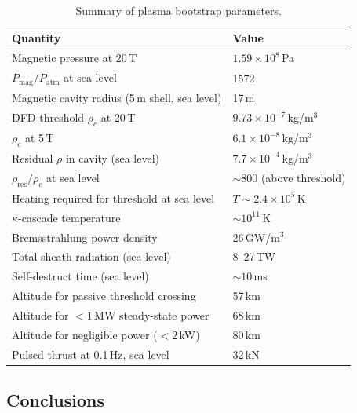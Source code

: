 \documentclass[12pt,a4paper]{article}
\begin{document}
\begin{table}[h]
\centering
\begin{tabular}{@{}p{7cm}l@{}}
\toprule
Quantity & Value \\
\midrule
Magnetic pressure at 20\,T & $1.59\times10^8$\,Pa \\
$P_{\text{mag}}/P_{\text{atm}}$ at sea level & 1572 \\
Magnetic cavity radius (5\,m shell, sea level) & 17\,m \\
DFD threshold $\rho_c$ at 20\,T & $9.73\times10^{-7}$\,kg/m$^3$ \\
$\rho_c$ at 5\,T & $6.1\times10^{-8}$\,kg/m$^3$ \\
Residual $\rho$ in cavity (sea level) & $7.7\times10^{-4}$\,kg/m$^3$ \\
$\rho_{\text{res}}/\rho_c$ at sea level & $\sim 800$ (above threshold) \\
Heating required for threshold at sea level & $T \sim 2.4\times10^5$\,K \\
$\kappa$-cascade temperature & $\sim 10^{11}$\,K \\
Bremsstrahlung power density & 26\,GW/m$^3$ \\
Total sheath radiation (sea level) & 8--27\,TW \\
Self-destruct time (sea level) & $\sim 10$\,ms \\
Altitude for passive threshold crossing & 57\,km \\
Altitude for $<1$\,MW steady-state power & 68\,km \\
Altitude for negligible power ($<2$\,kW) & 80\,km \\
Pulsed thrust at 0.1\,Hz, sea level & 32\,kN \\
\bottomrule
\end{tabular}
\caption{Summary of plasma bootstrap parameters.}
\end{table}

\subsection{Conclusions}
\end{document}
